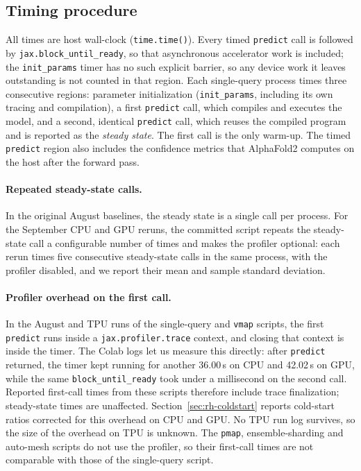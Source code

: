 \subsection{Timing procedure}
\label{sec:meth-timing}

All times are host wall-clock (\texttt{time.time()}). Every timed
\texttt{predict} call is followed by \texttt{jax.block\_until\_ready},
so that asynchronous accelerator work is included; the
\texttt{init\_params} timer has no such explicit barrier, so any device
work it leaves outstanding is not counted in that region. Each single-query process
times three consecutive regions: parameter initialization
(\texttt{init\_params}, including its own tracing and compilation), a
first \texttt{predict} call, which compiles and executes the model, and
a second, identical \texttt{predict} call, which reuses the compiled
program and is reported as the \emph{steady state}. The first call is
the only warm-up. The timed \texttt{predict} region also includes the
confidence metrics that AlphaFold2 computes on the host after the
forward pass.

\paragraph{Repeated steady-state calls.} In the original August
baselines, the steady state is a single call per process. For the
September CPU and GPU reruns, the committed script repeats the
steady-state call a configurable number of times and makes the profiler
optional: each rerun times five consecutive steady-state calls in the
same process, with the profiler disabled, and we report their mean and
sample standard deviation.

\paragraph{Profiler overhead on the first call.} In the August and TPU
runs of the single-query and \texttt{vmap} scripts, the first
\texttt{predict} runs inside a
\texttt{jax.profiler.trace} context, and closing that context is inside
the timer. The Colab logs let us measure this directly: after
\texttt{predict} returned, the timer kept running for another 36.00\,s
on CPU and 42.02\,s on GPU, while the same \texttt{block\_until\_ready}
took under a millisecond on the second call. Reported first-call times
from these scripts therefore include trace finalization; steady-state
times are unaffected. Section~\ref{sec:rh-coldstart} reports cold-start
ratios corrected for this overhead on CPU and GPU. No TPU run log
survives, so the size of the overhead on TPU is unknown. The
\texttt{pmap}, ensemble-sharding and auto-mesh scripts do not use the
profiler, so their first-call times are not comparable with those of
the single-query script.

